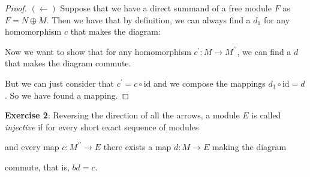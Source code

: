\documentclass{article}
\begin{document}
\begin{itemize}
\begin{proof}
            $(\leftarrow )$ Suppose that we have a direct summand of a free module $F$ as $F = N \oplus M$. Then we have that by definition, we can always find a $d_{1}$ for any homomorphism $c$ that makes the diagram:
                \begin{center}
                \end{center}
            Now we want to show that for any homomorphism $c^{\prime} : M \rightarrow M^{\prime\prime}$, we can find a $d$ that makes the diagram commute.
                \begin{center}
                \end{center}
            But we can just consider that $c^{\prime} = c \circ \text{id}$ and we compose the mappings $d_{1} \circ \text{id} = d$. So we have found a mapping.
        \end{proof}
\end{itemize}

\textbf{Exercise 2}: Reversing the direction of all the arrows, a module $E$ is called \textit{injective} if for every short exact sequence of modules
    \begin{center}
    \end{center}
and every map $c : M^{\prime\prime} \rightarrow E$ there exists a map $d : M \rightarrow E$ making the diagram
    \begin{center}
    \end{center}
commute, that is, $bd = c$.
\end{document}
